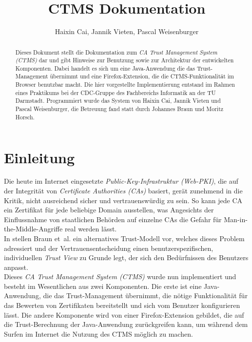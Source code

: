\documentclass[accentcolor=tud1c,article,colorback,11pt]{tudreport}
\title{CTMS Dokumentation}
\subtitle{Haixin Cai, Jannik Vieten, Pascal Weisenburger}
\begin{document}
\maketitle

\begin{abstract}
Dieses Dokument stellt die Dokumentation zum \textit{CA Trust Management System (CTMS)} dar und gibt Hinweise zur Benutzung sowie zur Architektur der entwickelten Komponenten. Dabei handelt es sich um eine Java-Anwendung die das Trust-Management übernimmt und eine Firefox-Extension, die die CTMS-Funktionalität im Browser benutzbar macht. Die hier vorgestellte Implementierung entstand im Rahmen eines Praktikums bei der CDC-Gruppe des Fachbereichs Informatik an der TU Darmstadt. Programmiert wurde das System von Haixin Cai, Jannik Vieten und Pascal Weisenburger, die Betreuung fand statt durch Johannes Braun und Moritz Horsch.
\end{abstract}
\newpage

\tableofcontents
\newpage

\section{Einleitung}

Die heute im Internet eingesetzte \textit{Public-Key-Infrastruktur (Web-PKI)}, die auf der Integrität von \textit{Certificate Authorities (CAs)} basiert, gerät zunehmend in die Kritik, nicht ausreichend sicher und vertrauenswürdig zu sein. So kann jede CA ein Zertifikat für jede beliebige Domain ausstellen, was Angesichts der Einflussnahme von staatlichen Behörden auf einzelne CAs die Gefahr für Man-in-the-Middle-Angriffe real werden lässt.\\
In \cite{braun2013trust} stellen Braun et~al. ein alternatives Trust-Modell vor, welches dieses Problem adressiert und der Vertrauensentscheidung einen benutzerspezifischen, individuellen \textit{Trust View} zu Grunde legt, der sich den Bedürfnissen des Benutzers anpasst.\\
Dieses \textit{CA Trust Management System (CTMS)} wurde nun implementiert und besteht im Wesentlichen aus zwei Komponenten. Die erste ist eine Java-Anwendung, die das Trust-Management übernimmt, die nötige Funktionalität für das Bewerten von Zertifikaten bereitstellt und sich vom Benutzer konfigurieren lässt. Die andere Komponente wird von einer Firefox-Extension gebildet, die auf die Trust-Berechnung der Java-Anwendung zurückgreifen kann, um während dem Surfen im Internet die Nutzung des CTMS möglich zu machen.
\end{document}
